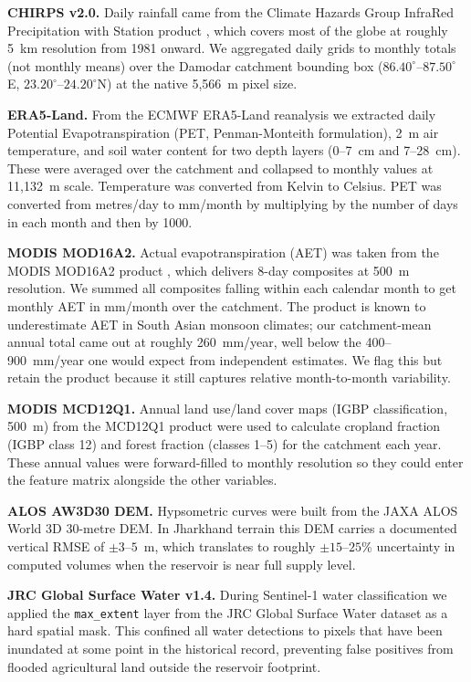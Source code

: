 \documentclass[12pt,a4paper,oneside]{report}
\begin{document}
\textbf{CHIRPS v2.0.} Daily rainfall came from the Climate Hazards Group
InfraRed Precipitation with Station product \citep{Funk2015}, which covers
most of the globe at roughly 5~km resolution from 1981 onward. We
aggregated daily grids to monthly totals (not monthly means) over the
Damodar catchment bounding box
($86.40^\circ$--$87.50^\circ$E, $23.20^\circ$--$24.20^\circ$N) at the
native 5,566~m pixel size.

\textbf{ERA5-Land.} From the ECMWF ERA5-Land reanalysis
\citep{MunozSabater2021} we extracted daily Potential Evapotranspiration
(PET, Penman-Monteith formulation), 2~m air temperature, and soil water
content for two depth layers (0--7~cm and 7--28~cm). These were averaged
over the catchment and collapsed to monthly values at 11,132~m scale.
Temperature was converted from Kelvin to Celsius. PET was converted from
metres/day to mm/month by multiplying by the number of days in each month
and then by 1000.

\textbf{MODIS MOD16A2.} Actual evapotranspiration (AET) was taken from the
MODIS MOD16A2 product \citep{Running2017}, which delivers 8-day composites
at 500~m resolution. We summed all composites falling within each calendar
month to get monthly AET in mm/month over the catchment. The product is
known to underestimate AET in South Asian monsoon climates; our
catchment-mean annual total came out at roughly 260~mm/year, well below the
400--900~mm/year one would expect from independent estimates. We flag this
but retain the product because it still captures relative month-to-month
variability.

\textbf{MODIS MCD12Q1.} Annual land use/land cover maps (IGBP
classification, 500~m) from the MCD12Q1 product were used to calculate
cropland fraction (IGBP class 12) and forest fraction (classes 1--5) for
the catchment each year. These annual values were forward-filled to monthly
resolution so they could enter the feature matrix alongside the other
variables.

\textbf{ALOS AW3D30 DEM.} Hypsometric curves were built from the JAXA ALOS
World 3D 30-metre DEM. In Jharkhand terrain this DEM carries a documented
vertical RMSE of $\pm 3$--$5$~m, which translates to roughly
$\pm 15$--$25$\% uncertainty in computed volumes when the reservoir is near
full supply level.

\textbf{JRC Global Surface Water v1.4.} During Sentinel-1 water
classification we applied the \texttt{max\_extent} layer from the JRC Global
Surface Water dataset \citep{Pekel2016} as a hard spatial mask. This
confined all water detections to pixels that have been inundated at some
point in the historical record, preventing false positives from flooded
agricultural land outside the reservoir footprint.
\end{document}
